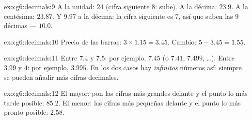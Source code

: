 \begin{solution}{exo:g6:decimals:9}
A la unidad: $24$ (cifra siguiente $8$: sube). A la décima: $23.9$.
A la centésima: $23.87$. Y $9.97$ a la décima: la cifra siguiente es
$7$, así que suben las $9$ décimas --- $10.0$.
\end{solution}

\begin{solution}{exo:g6:decimals:10}
Precio de las barras: $3 \times 1.15 = 3.45$. Cambio:
$5 - 3.45 = 1.55$.
\end{solution}

\begin{solution}{exo:g6:decimals:11}
Entre $7.4$ y $7.5$: por ejemplo, $7.45$ (o $7.41$, $7.499$,
\dots). Entre $3.99$ y $4$: por ejemplo, $3.995$. En los dos casos
hay \emph{infinitos} números así: siempre se pueden añadir más
cifras decimales.
\end{solution}

\begin{solution}{exo:g6:decimals:12}
El mayor: pon las cifras más grandes delante y el punto lo más tarde
posible: $85.2$. El menor: las cifras más pequeñas delante y el punto lo más
pronto posible: $2.58$.
\end{solution}

